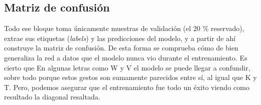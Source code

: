 \subsection{Matriz de confusión}


Todo ese bloque toma únicamente muestras de validación (el 20 \% reservado), extrae sus etiquetas (\textit{labels}) y las predicciones del modelo, y a partir de ahí construye la matriz de confusión. De esta forma se comprueba cómo de bien generaliza la red a datos que el modelo nunca vio durante el entrenamiento. Es cierto que En algunas letras como W y V el modelo se puede llegar a confundir, sobre todo porque estos gestos son sumamente parecidos entre sí, al igual que K y T. Pero, podemos asegurar que el entrenamiento fue todo un éxito viendo como resultado la diagonal resaltada.